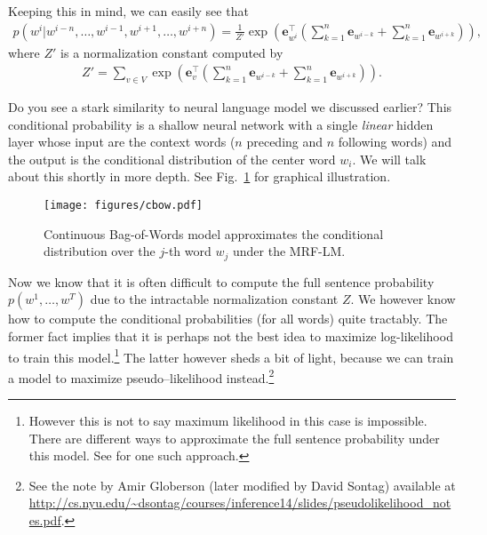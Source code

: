 \documentclass{report}
\newcommand{\vect}[1]{\mathbf{#1}}
\newcommand{\ve}[0]{\vect{e}}
\begin{document}
Keeping this in mind, we can easily see that
\begin{align*}
    p(w^i|w^{i-n}, \ldots, w^{i-1}, w^{i+1}, \ldots, w^{i+n})
    = \frac{1}{Z'} \exp\left(\ve_{w^i}^\top \left( 
            \sum_{k=1}^n 
            \ve_{w^{i-k}}
            +
            \sum_{k=1}^n 
            \ve_{w^{i+k}}
    \right)\right),
\end{align*}
where $Z'$ is a normalization constant computed by
\begin{align*}
    Z' = \sum_{v \in V} \exp\left( \ve_v^\top \left( 
            \sum_{k=1}^n 
            \ve_{w^{i-k}}
            +
            \sum_{k=1}^n 
            \ve_{w^{i+k}}
    \right)\right).
\end{align*}

Do you see a stark similarity to neural language model we discussed earlier?
This conditional probability is a shallow neural network with a single {\em
linear} hidden layer whose input are the context words ($n$ preceding and $n$
following words) and the output is the conditional distribution of the center
word $w_i$. We will talk about this shortly in more depth. See
Fig.~\ref{fig:cbow} for graphical illustration.

\begin{figure}[ht]
    \centering
    \texttt{[image: figures/cbow.pdf]}
    \caption{Continuous Bag-of-Words model approximates the conditional
    distribution over the $j$-th word $w_j$ under the MRF-LM.}
    \label{fig:cbow}
\end{figure}

Now we know that it is often difficult to compute the full sentence probability
$p(w^1, \ldots, w^T)$ due to the intractable normalization constant $Z$. We
however know how to compute the conditional probabilities (for all words) quite
tractably. The former fact implies that it is perhaps not the best idea to
maximize log-likelihood to train this model.\footnote{
    However this is not to say maximum likelihood in this case is impossible.
    There are different ways to approximate the full sentence probability under
    this model. See \citet{jernite2015fast} for one such approach.
} The latter however sheds a bit of light, because we can train a model to
maximize pseudo--likelihood \citep{besag1975statistical} instead.\footnote{
    See the note by Amir Globerson (later modified by David Sontag) available at
    \url{http://cs.nyu.edu/~dsontag/courses/inference14/slides/pseudolikelihood_notes.pdf}.
}
\end{document}
